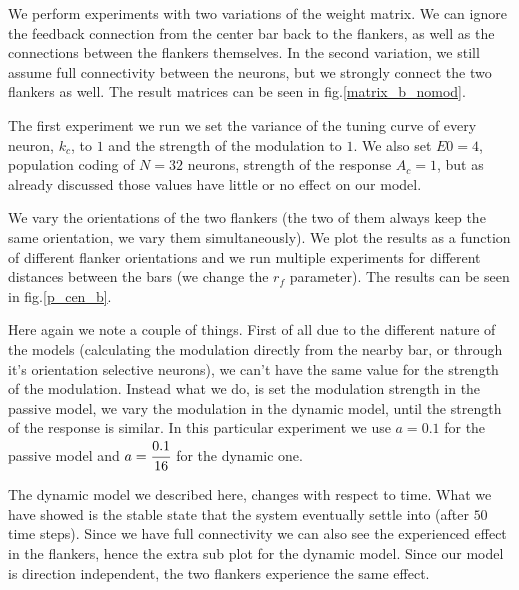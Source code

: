 We perform experiments with two variations of the weight matrix. We can ignore the feedback connection from the center bar back to the flankers, as well as the connections between the flankers themselves. In the second variation, we still assume full connectivity between the neurons, but we strongly connect the two flankers as well. The result matrices can be seen in fig.\ref{matrix_b_nomod}.



The first experiment we run we set the variance of the tuning curve of every neuron, $k_{c}$, to $1$ and the strength of the modulation to $1$. We also set $E0=4$, population coding of $N=32$ neurons, strength of the response $A_{c}=1$, but as already discussed those values have little or no effect on our model.

We vary the orientations of the two flankers (the two of them always keep the same orientation, we vary them simultaneously). We plot the results as a function of different flanker orientations and we run multiple experiments for different distances between the bars (we change the $r_{f}$ parameter). The results can be seen in fig.\ref{p_cen_b}.


Here again we note a couple of things. First of all due to the different nature of the models (calculating the modulation directly from the nearby bar, or through it's orientation selective neurons), we can't have the same value for the strength of the modulation. Instead what we do, is set the modulation strength in the passive model, we vary the modulation in the dynamic model, until the strength of the response is similar. In this particular experiment we use $a=0.1$ for the passive model and $a=\cfrac{0.1}{16}$ for the dynamic one.

The dynamic model we described here, changes with respect to time. What we have showed is the stable state that the system eventually settle into (after $50$ time steps). Since we have full connectivity we can also see the experienced effect in the flankers, hence the extra sub plot for the dynamic model. Since our model is direction independent, the two flankers experience the same effect.


